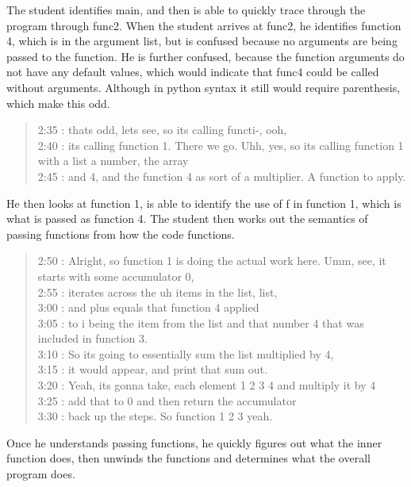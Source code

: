 \documentclass{article}
\begin{document}
The student identifies main, and then is able to quickly trace through the program through func2.
When the student arrives at func2, he identifies function 4, which is in the argument list, but is confused because no arguments are being passed to the function.
He is further confused, because the function arguments do not have any default values, which would indicate that func4 could be called without arguments.
Although in python syntax it still would require parenthesis, which make this odd.

\begin{quote}
2:35 : thats odd, lets see, so its calling functi-, ooh, \\
2:40 : its calling function 1. There we go. Uhh, yes, so its calling function 1 with a list a number, the array \\
2:45 : and 4, and the function 4 as sort of a multiplier. A function to apply. \\
\end{quote}

He then looks at function 1, is able to identify the use of f in function 1, which is what is passed as function 4.
The student then works out the semantics of passing functions from how the code functions.

\begin{quote}
2:50 : Alright, so function 1 is doing the actual work here. Umm, see, it starts with some accumulator 0,  \\
2:55 : iterates across the uh items in the list, list, \\
3:00 : and plus equals that function 4 applied \\
3:05 : to i being the item from the list and that number 4 that was included in function 3. \\
3:10 : So its going to essentially sum the list multiplied by 4, \\
3:15 : it would appear, and print that sum out. \\
3:20 : Yeah, its gonna take, each element 1 2 3 4 and multiply it by 4 \\
3:25 : add that to 0 and then return the accumulator \\
3:30 : back up the steps. So function 1 2 3 yeah. \\
\end{quote}

Once he understands passing functions, he quickly figures out what the inner function does, then unwinds the functions and determines what the overall program does.
\end{document}
